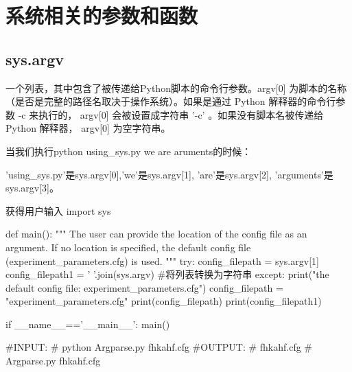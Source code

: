 \documentclass[11pt]{article}
\begin{document}
\section{系统相关的参数和函数}
\subsection{sys.argv}
一个列表，其中包含了被传递给Python脚本的命令行参数。argv[0] 为脚本的名称（是否是完整的路径名取决于操作系统）。如果是通过 Python 解释器的命令行参数 -c 来执行的， argv[0] 会被设置成字符串 '-c' 。如果没有脚本名被传递给 Python 解释器， argv[0] 为空字符串。

当我们执行python using\_sys.py we are aruments的时候：

'using\_sys.py'是sys.argv[0],\qquad 'we'是sys.argv[1], \qquad 'are'是sys.argv[2], \qquad 'arguments'是sys.argv[3]。
\begin{Python}{获得用户输入}
import sys

def main():
	"""
	The user can provide the location of the config file as an argument.
	If no location is specified, the default config file (experiment_parameters.cfg) is used.
	"""
	try:
	config_filepath = sys.argv[1]
	config_filepath1 = ' '.join(sys.argv)	#将列表转换为字符串
	except:
	print("\nUsing the default config file: experiment_parameters.cfg\n")
	config_filepath = "experiment_parameters.cfg"
	print(config_filepath)
	print(config_filepath1)

if __name__=='__main__':
main()

#INPUT:
#       python Argparse.py fhkahf.cfg
#OUTPUT:
#       fhkahf.cfg
#       Argparse.py fhkahf.cfg
\end{Python}
\end{document}
